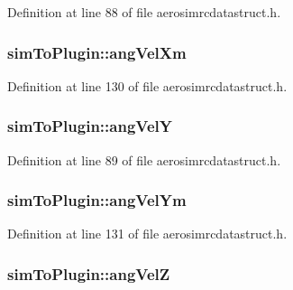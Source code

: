 Definition at line 88 of file aerosimrcdatastruct.\-h.

\hypertarget{group___aero_sim_r_c_gac5161f5332b6bc49ca097e2c27be8a22}{
\subsubsection[{ang\-Vel\-Xm}]{ sim\-To\-Plugin\-::ang\-Vel\-Xm}}\label{group___aero_sim_r_c_gac5161f5332b6bc49ca097e2c27be8a22}


Definition at line 130 of file aerosimrcdatastruct.\-h.

\hypertarget{group___aero_sim_r_c_ga6e7df4d87006342b893db0452de1d4db}{
\subsubsection[{ang\-Vel\-Y}]{ sim\-To\-Plugin\-::ang\-Vel\-Y}}\label{group___aero_sim_r_c_ga6e7df4d87006342b893db0452de1d4db}


Definition at line 89 of file aerosimrcdatastruct.\-h.

\hypertarget{group___aero_sim_r_c_ga1cdf55eb78da8c312e32d9d5be75afef}{
\subsubsection[{ang\-Vel\-Ym}]{ sim\-To\-Plugin\-::ang\-Vel\-Ym}}\label{group___aero_sim_r_c_ga1cdf55eb78da8c312e32d9d5be75afef}


Definition at line 131 of file aerosimrcdatastruct.\-h.

\hypertarget{group___aero_sim_r_c_gaaabca3226ef304ba1333129c54a8c777}{
\subsubsection[{ang\-Vel\-Z}]{ sim\-To\-Plugin\-::ang\-Vel\-Z}}\label{group___aero_sim_r_c_gaaabca3226ef304ba1333129c54a8c777}


